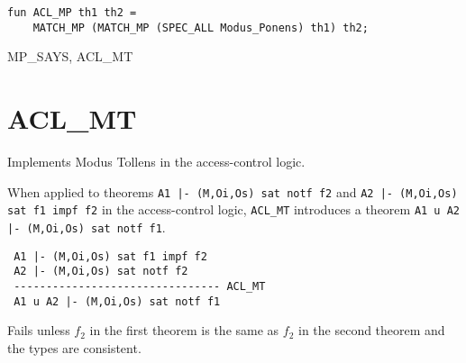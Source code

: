 \IMPLEMENTATION
\begin{holboxed}
\begin{verbatim}
fun ACL_MP th1 th2 = 
    MATCH_MP (MATCH_MP (SPEC_ALL Modus_Ponens) th1) th2;
\end{verbatim}
\end{holboxed}

\SEEALSO
MP\_SAYS, ACL\_MT
\ENDDOC

\section{ACL\_MT}



\egroup


\SYNOPSIS
Implements Modus Tollens in the access-control logic.

\DESCRIBE
When applied to theorems \texttt{A1 |- (M,Oi,Os) sat notf f2} and
\texttt{A2 |- (M,Oi,Os) sat f1 impf f2} in the access-control logic,
\texttt{ACL_MT} introduces a theorem \texttt{A1 u A2 |- (M,Oi,Os) sat notf f1}.
\begin{verbatim}
 A1 |- (M,Oi,Os) sat f1 impf f2    
 A2 |- (M,Oi,Os) sat notf f2
 -------------------------------- ACL_MT
 A1 u A2 |- (M,Oi,Os) sat notf f1
\end{verbatim}

\FAILURE
Fails unless $f_2$ in the first theorem is the same as $f_2$ in the second
theorem and the types are consistent.

